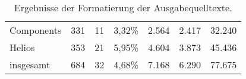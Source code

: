 \begin{table}[tbh]
  \footnotesize
  \begin{tabu} to 
    \midrule
     &  &  &  &  &  &  \\
    \midrule
    Components & 331 & 11 & 3,32\% & 2.564 & 2.417 & 32.240 \\
    Helios     & 353 & 21 & 5,95\% & 4.604 & 3.873 & 45.436 \\
    \midrule
    insgesamt  & 684 & 32 & 4,68\% & 7.168 & 6.290 & 77.675 \\
    \midrule
  \end{tabu}
  \caption{Ergebnisse der Formatierung der Ausgabequelltexte.}
  \label{tab:results-formatting}
\end{table}
